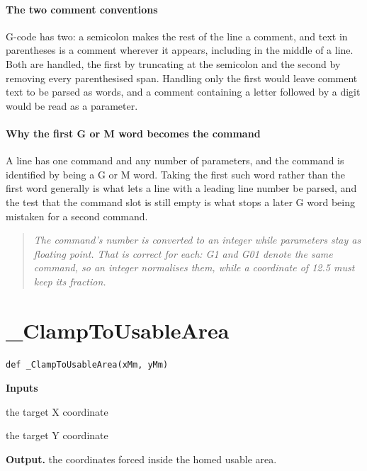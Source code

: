 \paragraph{The two comment conventions}
G-code has two: a semicolon makes the rest of the line a comment, and text in parentheses is a comment wherever it appears, including in the middle of a line. Both are handled, the first by truncating at the semicolon and the second by removing every parenthesised span. Handling only the first would leave comment text to be parsed as words, and a comment containing a letter followed by a digit would be read as a parameter.


\paragraph{Why the first G or M word becomes the command}
A line has one command and any number of parameters, and the command is identified by being a G or M word. Taking the first such word rather than the first word generally is what lets a line with a leading line number be parsed, and the test that the command slot is still empty is what stops a later G word being mistaken for a second command.


\begin{quote}\small\itshape The command's number is converted to an integer while parameters stay as floating point. That is correct for each: G1 and G01 denote the same command, so an integer normalises them, while a coordinate of 12.5 must keep its fraction.\end{quote}

\section{\_ClampToUsableArea}
\begin{lstlisting}[style=sig]
def _ClampToUsableArea(xMm, yMm)
\end{lstlisting}

\noindent\textbf{Inputs}
\begin{description}[leftmargin=2.2em,style=nextline,font=\normalfont\ttfamily]\setlength\itemsep{1pt}
  \item[{xMm}] \normalfont the target X coordinate
  \item[{yMm}] \normalfont the target Y coordinate
\end{description}

\noindent\textbf{Output.} the coordinates forced inside the homed usable area.


